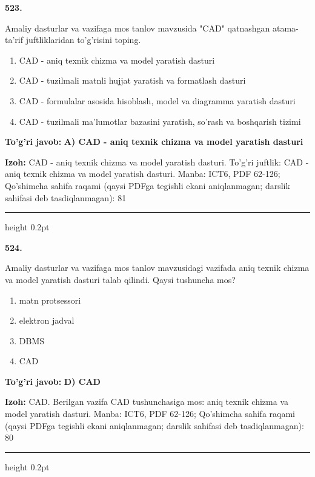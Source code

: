 \documentclass[10pt,a4paper]{article}
\begin{document}
{\bfseries\sffamily\color{ink} 523.}
\par
Amaliy dasturlar va vazifaga mos tanlov mavzusida "CAD" qatnashgan atama-ta'rif juftliklaridan to'g'risini toping.
\begin{enumerate}[label=\Alph*),leftmargin=9mm]
\item CAD - aniq texnik chizma va model yaratish dasturi
\item CAD - tuzilmali matnli hujjat yaratish va formatlash dasturi
\item CAD - formulalar asosida hisoblash, model va diagramma yaratish dasturi
\item CAD - tuzilmali ma'lumotlar bazasini yaratish, so'rash va boshqarish tizimi
\end{enumerate}
\begin{tcolorbox}[enhanced,breakable,colback=teal!4,colframe=teal!60!black,boxrule=0.45pt,arc=1.2mm,left=2.7mm,right=2.7mm,top=1.8mm,bottom=1.8mm,before skip=2mm,after skip=2mm]
{\bfseries\sffamily\color{teal}To'g'ri javob:} \textbf{A) CAD - aniq texnik chizma va model yaratish dasturi}
\par\smallskip
{\bfseries Izoh:} CAD - aniq texnik chizma va model yaratish dasturi. To'g'ri juftlik: CAD - aniq texnik chizma va model yaratish dasturi. Manba: ICT6, PDF 62-126; Qo'shimcha sahifa raqami (qaysi PDFga tegishli ekani aniqlanmagan; darslik sahifasi deb tasdiqlanmagan): 81
\end{tcolorbox}
\vspace{2mm}\hrule height 0.2pt\vspace{3mm}

{\bfseries\sffamily\color{ink} 524.}
\par
Amaliy dasturlar va vazifaga mos tanlov mavzusidagi vazifada aniq texnik chizma va model yaratish dasturi talab qilindi. Qaysi tushuncha mos?
\begin{enumerate}[label=\Alph*),leftmargin=9mm]
\item matn protsessori
\item elektron jadval
\item DBMS
\item CAD
\end{enumerate}
\begin{tcolorbox}[enhanced,breakable,colback=teal!4,colframe=teal!60!black,boxrule=0.45pt,arc=1.2mm,left=2.7mm,right=2.7mm,top=1.8mm,bottom=1.8mm,before skip=2mm,after skip=2mm]
{\bfseries\sffamily\color{teal}To'g'ri javob:} \textbf{D) CAD}
\par\smallskip
{\bfseries Izoh:} CAD. Berilgan vazifa CAD tushunchasiga mos: aniq texnik chizma va model yaratish dasturi. Manba: ICT6, PDF 62-126; Qo'shimcha sahifa raqami (qaysi PDFga tegishli ekani aniqlanmagan; darslik sahifasi deb tasdiqlanmagan): 80
\end{tcolorbox}
\vspace{2mm}\hrule height 0.2pt\vspace{3mm}
\end{document}
